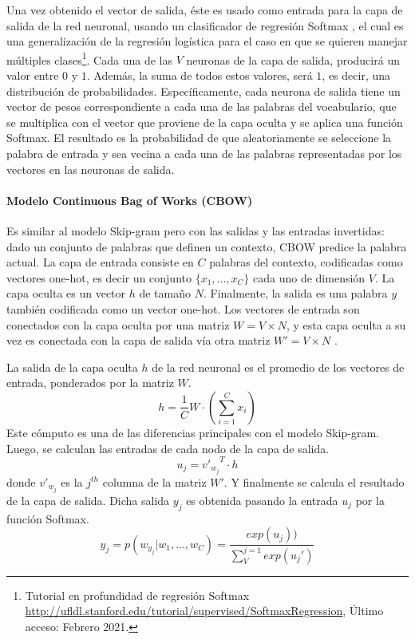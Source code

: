 \bigskip Una vez obtenido el vector de salida, éste es usado como entrada para la capa de salida de la red neuronal, usando un clasificador de regresión Softmax \citep{morin2005hierarchical}, el cual es una generalización de la regresión logística para el caso en que se quieren manejar múltiples clases\footnote{Tutorial en profundidad de regresión Softmax \url{http://ufldl.stanford.edu/tutorial/supervised/SoftmaxRegression}, Último acceso: Febrero 2021.}. Cada una de las \(V\) neuronas de la capa de salida, producirá un valor entre \(0\) y \(1\). Además, la suma de todos estos valores, será \(1\), es decir, una distribución de probabilidades. Específicamente, cada neurona de salida tiene un vector de pesos correspondiente a cada una de las palabras del vocabulario, que se multiplica con el vector que proviene de la capa oculta y se aplica una función Softmax. El resultado es la probabilidad de que aleatoriamente se seleccione la palabra de entrada y sea vecina a cada una de las palabras representadas por los vectores en las neuronas de salida.

\paragraph{Modelo Continuous Bag of Works (CBOW)}
Es similar al modelo Skip-gram pero con las salidas y las entradas invertidas: dado un conjunto de palabras que definen un contexto, CBOW predice la palabra actual. La capa de entrada consiste en \(C\) palabras del contexto, codificadas como vectores one-hot, es decir un conjunto \( \{x_1,..., x_C\}\) cada uno de dimensión \(V\). La capa oculta es un vector \(h\) de tamaño \(N\). Finalmente, la salida es una palabra \(y\) también codificada como un vector one-hot. Los vectores de entrada son conectados con la capa oculta por una matriz \(W=V \times N\), y esta capa oculta a su vez es conectada con la capa de salida vía otra matriz \(W'=V \times N\) \citep{cbowmodel}.

\bigskip La salida de la capa oculta \(h\) de la red neuronal es el promedio de los vectores de entrada, ponderados por la matriz \(W\).
\[h = \frac{1}{C}W \cdot (\sum_{i=1}^{C}{x_i})\]
Este cómputo es una de las diferencias principales con el modelo Skip-gram. Luego, se calculan las entradas de cada nodo de la capa de salida.
\[u_j = {v'_{w_j}}^{T} \cdot h\]
donde \(v'_{w_j}\) es la \(j^{th}\) columna de la matriz \(W'\). Y finalmente se calcula el resultado de la capa de salida. Dicha salida \(y_j\) es obtenida pasando la entrada \(u_j\) por la función Softmax.
\[y_j=p(w_{y_j}|w_1,...,w_C)=\frac{exp(u_j))}{\sum_{V}^{j=1}exp(u_j')}\]

